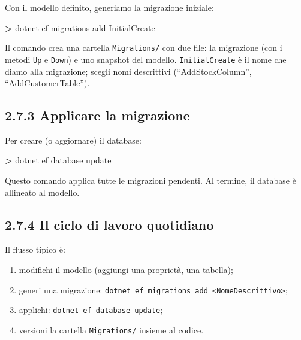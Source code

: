 \documentclass[
  italian,
  10pt,
]{book}
\newenvironment{Shaded}{\begin{snugshade}}{\end{snugshade}}
\newcommand{\ExtensionTok}[1]{#1}
\newcommand{\NormalTok}[1]{#1}
\newcommand{\OperatorTok}[1]{\textcolor[rgb]{0.81,0.36,0.00}{\textbf{#1}}}
\providecommand{\tightlist}{%
  \setlength{\itemsep}{0pt}\setlength{\parskip}{0pt}}
\begin{document}
Con il modello definito, generiamo la migrazione iniziale:

\begin{Shaded}
\begin{Highlighting}[]
\OperatorTok{\textgreater{}}\NormalTok{ dotnet }\ExtensionTok{ef}\NormalTok{ migrations add InitialCreate}
\end{Highlighting}
\end{Shaded}

Il comando crea una cartella \texttt{Migrations/} con due file: la
migrazione (con i metodi \texttt{Up} e \texttt{Down}) e uno snapshot del
modello. \texttt{InitialCreate} è il nome che diamo alla migrazione;
scegli nomi descrittivi (``AddStockColumn'', ``AddCustomerTable'').

\subsection{2.7.3 Applicare la
migrazione}\label{applicare-la-migrazione}

Per creare (o aggiornare) il database:

\begin{Shaded}
\begin{Highlighting}[]
\OperatorTok{\textgreater{}}\NormalTok{ dotnet }\ExtensionTok{ef}\NormalTok{ database update}
\end{Highlighting}
\end{Shaded}

Questo comando applica tutte le migrazioni pendenti. Al termine, il
database è allineato al modello.

\subsection{2.7.4 Il ciclo di lavoro
quotidiano}\label{il-ciclo-di-lavoro-quotidiano}

Il flusso tipico è:

\begin{enumerate}
\def\labelenumi{\arabic{enumi}.}
\tightlist
\item
  modifichi il modello (aggiungi una proprietà, una tabella);
\item
  generi una migrazione:
  \texttt{dotnet\ ef\ migrations\ add\ \textless{}NomeDescrittivo\textgreater{}};
\item
  applichi: \texttt{dotnet\ ef\ database\ update};
\item
  versioni la cartella \texttt{Migrations/} insieme al codice.
\end{enumerate}
\end{document}
